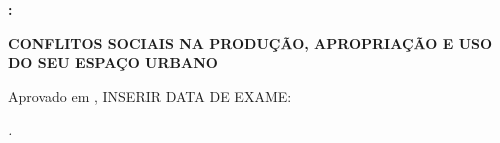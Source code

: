 \documentclass[
	12pt,					%
	openright,			%
	twoside,			%
	a4paper,			%
	english,				%
	french,				%
	spanish,			%
	brazil				%
	]{abntex2}
\newcommand{\subtitulo}{\bfseries Conflitos sociais na produção, apropriação e uso do seu espaço urbano}
\begin{document}
%


%
% 
%
\begin{folhadeaprovacao}

  \begin{center}
    \MakeUppercase{\fontsize{14}{16}\selectfont\bfseries\imprimirautor}

    \vspace{3cm}
 
      \MakeUppercase{\fontsize{14}{16}\selectfont\bfseries\imprimirtitulo:}
      
      \medskip
      \MakeUppercase{\subtitulo}
    \end{center}
    \bigskip
    \begin{quote}
        \imprimirpreambulo
    \end{quote}
        \bigskip
 
        
   \begin{flushright}
   	Aprovado em \imprimirlocal, INSERIR DATA DE EXAME:
   \end{flushright}

      
 \end{folhadeaprovacao}

\begin{dedicatoria}
   \vspace*{\fill}
   \centering
   \noindent
   \textit{\lipsum[1].} \vspace*{\fill}
\end{dedicatoria}
\end{document}
